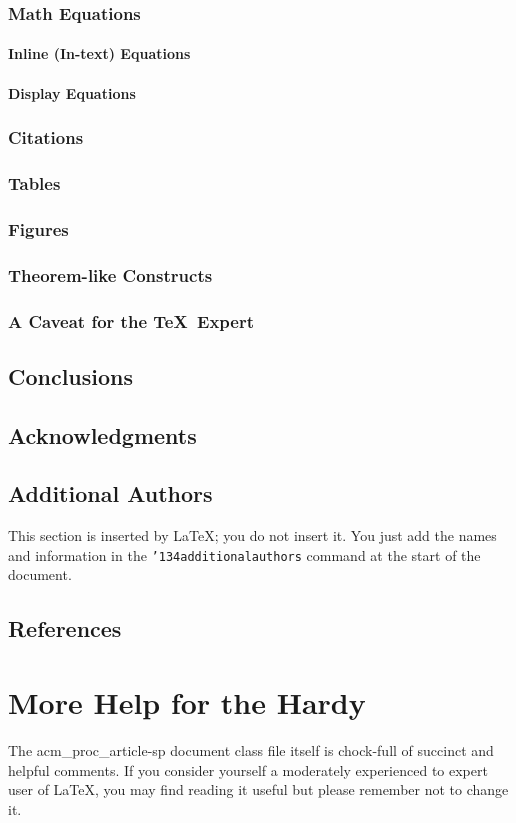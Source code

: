 \documentclass{acm_proc_article-sp}
\begin{document}
\subsubsection{Math Equations}
\paragraph{Inline (In-text) Equations}
\paragraph{Display Equations}
\subsubsection{Citations}
\subsubsection{Tables}
\subsubsection{Figures}
\subsubsection{Theorem-like Constructs}
\subsubsection*{A Caveat for the \TeX\ Expert}
\subsection{Conclusions}
\subsection{Acknowledgments}
\subsection{Additional Authors}
This section is inserted by \LaTeX; you do not insert it.
You just add the names and information in the
\texttt{{\char'134}additionalauthors} command at the start
of the document.
\subsection{References}
\section{More Help for the Hardy}
The acm\_proc\_article-sp document class file itself is chock-full of succinct
and helpful comments.  If you consider yourself a moderately
experienced to expert user of \LaTeX, you may find reading
it useful but please remember not to change it.
\balancecolumns
\end{document}
